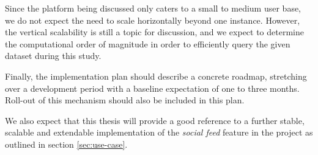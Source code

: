 \documentclass[fleqn,10pt]{voorstel}
\begin{document}
Since the platform being discussed only caters to a small to medium user base, we do not expect the need to scale horizontally beyond one instance. However, the vertical scalability is still a topic for discussion, and we expect to determine the computational order of magnitude in order to efficiently query the given dataset during this study.

Finally, the implementation plan should describe a concrete roadmap, stretching over a development period with a baseline expectation of one to three months. Roll-out of this mechanism should also be included in this plan.

We also expect that this thesis will provide a good reference to a further stable, scalable and extendable implementation of the \textit{social feed} feature in the \textcite{OpenWebslides} project as outlined in section \ref{sec:use-case}.


\nocite{KaurRani2013}

\printbibliography[heading=bibintoc]
\end{document}
